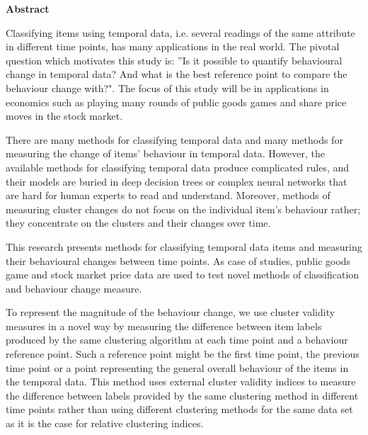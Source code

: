\begin{center}

\textbf{Abstract}
\end{center}

\normalsize


Classifying items using temporal data, i.e. several readings of the same attribute in different time points, has many applications in the real world. The pivotal question which motivates this study is: ''Is it possible to quantify behavioural change in temporal data? And what is the best reference point to compare the behaviour change with?". The focus of this study will be in applications in economics such as playing many rounds of public goods games and share price moves in the stock market.

There are many methods for classifying temporal data and many methods for measuring the change of items' behaviour in temporal data. However, the available methods for classifying temporal data produce complicated rules, and their models are buried in deep decision trees or complex neural networks that are hard for human experts to read and understand. Moreover, methods of measuring cluster changes do not focus on the individual item's behaviour rather; they concentrate on the clusters and their changes over time.

This research presents methods for classifying temporal data items and measuring their behavioural changes between time points. As case of studies, public goods game and stock market price data are used to test novel methods of classification and behaviour change measure.

To represent the magnitude of the behaviour change, we use cluster validity measures in a novel way by measuring the difference between item labels produced by the same clustering algorithm at each time point and a behaviour reference point. Such a reference point might be the first time point, the previous time point or a point representing the general overall behaviour of the items in the temporal data. This method uses external cluster validity indices to measure the difference between labels provided by the same clustering method in different time points rather than using different clustering methods for the same data set as it is the case for relative clustering indices.

